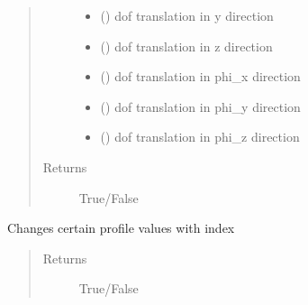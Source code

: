 \documentclass[letterpaper,10pt,english]{sphinxmanual}
\begin{document}
\begin{fulllineitems}
\begin{fulllineitems}
\begin{quote}
\begin{description}
\begin{itemize}
\item {} 
 () \textendash{} dof translation in y direction

\item {} 
 () \textendash{} dof translation in z direction

\item {} 
 () \textendash{} dof translation in phi\_x direction

\item {} 
 () \textendash{} dof translation in phi\_y direction

\item {} 
 () \textendash{} dof translation in phi\_z direction

\end{itemize}

\item[{Returns}] \leavevmode
True/False

\end{description}\end{quote}

\end{fulllineitems}


\begin{fulllineitems}
\label{\detokenize{api:beamon.database.database.Database.change_profile}}
Changes certain profile values with index
\begin{quote}\begin{description}
\item[{Returns}] \leavevmode
True/False


\end{description}
\end{quote}
\end{fulllineitems}
\end{fulllineitems}
\end{document}
